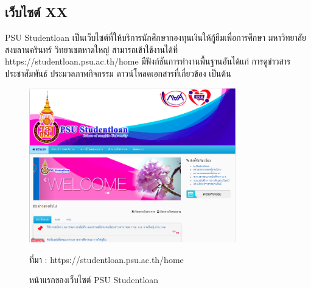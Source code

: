 		 \subsection{เว็บไซต์ XX}
		 PSU Studentloan \cite{PSU} เป็นเว็บไซต์ที่ให้บริการนักศึกษากองทุนเงินให้กู้ยืมเพื่อการศึกษา มหาวิทยาลัยสงขลานครินทร์ วิทยาเขตหาดใหญ่ สามารถเข้าใช้งานได้ที่ https://studentloan.psu.ac.th/home มีฟังก์ชันการทำงานพื้นฐานอันได้แก่ การดูข่าวสารประชาสัมพันธ์  ประมวลภาพกิจกรรม ดาวน์โหลดเอกสารที่เกี่ยวข้อง เป็นต้น
			 \begin{figure}[H]
			 	\centering
			 	\includegraphics[width=0.8\textwidth]{Figures/2/1}
			 	\caption{หน้าแรกของเว็บไซต์ PSU Studentloan}{ที่มา : https://studentloan.psu.ac.th/home}
			 	\label{Fig:Studentloan1}
			 \end{figure}
			 
